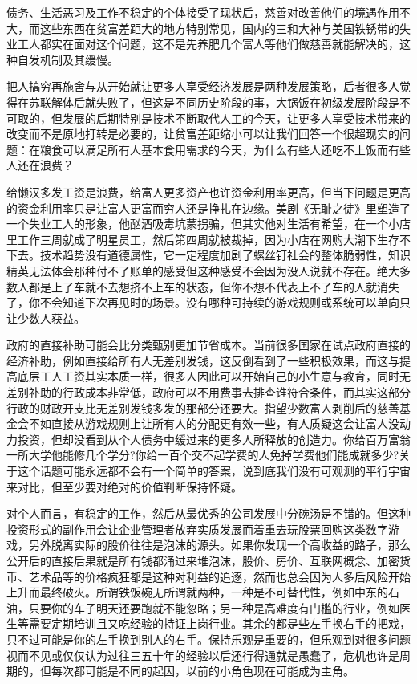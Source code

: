 \documentclass[]{book}
\begin{document}
债务、生活恶习及工作不稳定的个体接受了现状后，慈善对改善他们的境遇作用不大，而这些东西在贫富差距大的地方特别常见，国内的三和大神与美国铁锈带的失业工人都实在面对这个问题，这不是先养肥几个富人等他们做慈善就能解决的，这种自发机制及其缓慢。

把人搞穷再施舍与从开始就让更多人享受经济发展是两种发展策略，后者很多人觉得在苏联解体后就失败了，但这是不同历史阶段的事，大锅饭在初级发展阶段是不可取的，但发展的后期特别是技术不断取代人工的今天，让更多人享受技术带来的改变而不是原地打转是必要的，让贫富差距缩小可以让我们回答一个很超现实的问题：在粮食可以满足所有人基本食用需求的今天，为什么有些人还吃不上饭而有些人还在浪费？

给懒汉多发工资是浪费，给富人更多资产也许资金利用率更高，但当下问题是更高的资金利用率只是让富人更富而穷人还是挣扎在边缘。美剧《无耻之徒》里塑造了一个失业工人的形象，他酗酒吸毒坑蒙拐骗，但其实他对生活有希望，在一个小店里工作三周就成了明星员工，然后第四周就被裁掉，因为小店在网购大潮下生存不下去。技术趋势没有道德属性，它一定程度加剧了螺丝钉社会的整体脆弱性，知识精英无法体会那种付不了账单的感受但这种感受不会因为没人说就不存在。绝大多数人都是上了车就不去想挤不上车的状态，但你不想不代表上不了车的人就消失了，你不会知道下次再见时的场景。没有哪种可持续的游戏规则或系统可以单向只让少数人获益。

政府的直接补助可能会比分类甄别更加节省成本。当前很多国家在试点政府直接的经济补助，例如直接给所有人无差别发钱，这反倒看到了一些积极效果，而这与提高底层工人工资其实本质一样，很多人因此可以开始自己的小生意与教育，同时无差别补助的行政成本非常低，政府可以不用费事去排查谁符合条件，而其实这部分行政的财政开支比无差别发钱多发的那部分还要大。指望少数富人剥削后的慈善基金会不如直接从游戏规则上让所有人的分配更有效一些，有人质疑这会让富人没动力投资，但却没看到从个人债务中缓过来的更多人所释放的创造力。你给百万富翁一所大学他能修几个学分?你给一百个交不起学费的人免掉学费他们能成就多少?关于这个话题可能永远都不会有一个简单的答案，说到底我们没有可观测的平行宇宙来对比，但至少要对绝对的价值判断保持怀疑。

对个人而言，有稳定的工作，然后从最优秀的公司发展中分碗汤是不错的。但这种投资形式的副作用会让企业管理者放弃实质发展而着重去玩股票回购这类数字游戏，另外脱离实际的股价往往是泡沫的源头。如果你发现一个高收益的路子，那么公开后的直接后果就是所有钱都涌过来堆泡沫，股价、房价、互联网概念、加密货币、艺术品等的价格疯狂都是这种对利益的追逐，然而也总会因为人多后风险开始上升而最终破灭。所谓铁饭碗无所谓就两种，一种是不可替代性，例如中东的石油，只要你的车子明天还要跑就不能忽略；另一种是高难度有门槛的行业，例如医生等需要定期培训且又吃经验的持证上岗行业。其余的都是些左手换右手的把戏，只不过可能是你的左手换到别人的右手。保持乐观是重要的，但乐观到对很多问题视而不见或仅仅认为过往三五十年的经验以后还行得通就是愚蠢了，危机也许是周期的，但每次都可能是不同的起因，以前的小⻆色现在可能成为主⻆。
\end{document}
